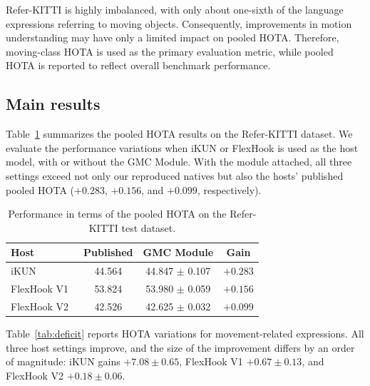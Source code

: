 \documentclass{article}
\begin{document}
Refer-KITTI is highly imbalanced, with only about one-sixth of the language expressions referring to moving objects. Consequently, improvements in motion understanding may have only a limited impact on pooled HOTA. Therefore, moving-class HOTA is used as the primary evaluation metric, while pooled HOTA is reported to reflect overall benchmark performance.

\subsection{Main results}
\label{sec:main}
Table~\ref{tab:main} summarizes the pooled HOTA results on the Refer-KITTI dataset. We evaluate the performance variations when iKUN or FlexHook is used as the host model, with or without the GMC Module. With the module attached, all three settings exceed not only our reproduced natives but also the hosts' published pooled HOTA ($+0.283$, $+0.156$, and $+0.099$, respectively).


\begin{table}
  \centering
  \caption{Performance in terms of the pooled HOTA on the Refer-KITTI test dataset.}
  \label{tab:main}
  \small
  \setlength{\tabcolsep}{2pt}
  \begin{tabular}{lccc}
    \hline
    Host                        & Published & GMC Module           & Gain                      \\
    \hline
    iKUN~\cite{ikun}            & 44.564    & 44.847 $\pm$ 0.107 & $+0.283$ \\
    FlexHook V1~\cite{flexhook} & 53.824    & 53.980 $\pm$ 0.059 & $+0.156$ \\
    FlexHook V2~\cite{flexhook} & 42.526    & 42.625 $\pm$ 0.032 & $+0.099$ \\
    \hline
  \end{tabular}
\end{table}


Table~\ref{tab:deficit} reports HOTA variations for movement-related expressions. All three host settings improve, and the size of the improvement differs by an order of magnitude: iKUN gains $+7.08\pm0.65$, FlexHook V1 $+0.67\pm0.13$, and FlexHook V2 $+0.18\pm0.06$.
\end{document}
